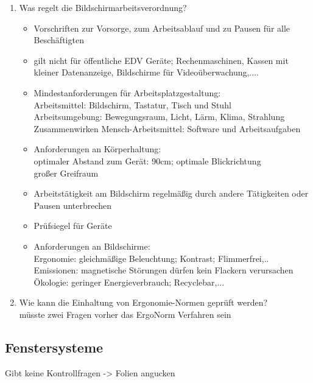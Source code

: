 \begin{enumerate}
	\item Was regelt die Bildschirmarbeitsverordnung?
	\begin{itemize}
		\item Vorschriften zur Vorsorge, zum Arbeitsablauf und zu Pausen für alle Beschäftigten
		\item gilt nicht für öffentliche EDV Geräte; Rechenmaschinen, Kassen mit kleiner Datenanzeige, Bildschirme für Videoüberwachung,....
		\item Mindestanforderungen für Arbeitsplatzgestaltung: \\
		Arbeitsmittel: Bildschirm, Tastatur, Tisch und Stuhl\\
		Arbeitsumgebung: Bewegungsraum, Licht, Lärm, Klima, Strahlung\\
		Zusammenwirken Mensch-Arbeitsmittel: Software und Arbeitsaufgaben
		\item Anforderungen an Körperhaltung: \\
		optimaler Abstand zum Gerät: 90cm; optimale Blickrichtung\\
		großer Greifraum
		\item Arbeitstätigkeit am Bildschirm regelmäßig durch andere Tätigkeiten oder Pausen unterbrechen
		\item Prüfsiegel für Geräte
		\item Anforderungen an Bildschirme: \\
		Ergonomie: gleichmäßige Beleuchtung; Kontrast; Flimmerfrei,..\\
		Emissionen: magnetische Störungen dürfen kein Flackern verursachen\\
		Ökologie: geringer Energieverbrauch; Recyclebar,...
	\end{itemize}
	
	\item Wie kann die Einhaltung von Ergonomie-Normen geprüft werden?\\
	müsste zwei Fragen vorher das ErgoNorm Verfahren sein
\end{enumerate}

\subsection{Fenstersysteme}
Gibt keine Kontrollfragen -> Folien angucken

